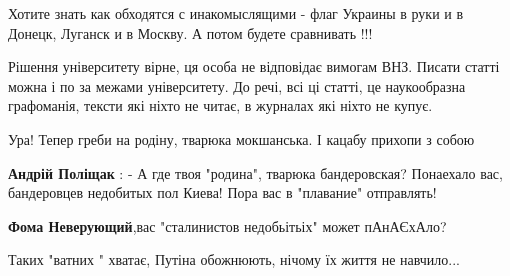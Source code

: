 \begin{itemize}
Хотите знать как обходятся с инакомыслящими - флаг Украины в руки и в Донецк, Луганск и в Москву. А потом будете сравнивать !!!

 

Рішення університету вірне, ця особа не відповідає вимогам ВНЗ. Писати статті
можна і по за межами університету. До речі, всі ці статті, це наукообразна
графоманія, тексти які ніхто не читає, в журналах які ніхто не купує.

 
Ура! Тепер греби на родіну, тварюка мокшанська. І кацабу прихопи з собою

\begin{itemize}
 
\textbf{Андрій Поліщак} : - А где твоя "родина", тварюка бандеровская? Понаехало вас, бандеровцев недобитых пол Киева! Пора вас в "плавание" отправлять!

 
\textbf{Фома Неверующий},вас "сталинистов недобьітьіх" может пАнАЄхАло?
\end{itemize}

 
Таких "ватних " хватає, Путіна обожнюють, нічому їх життя не навчило...

 

\end{itemize}
